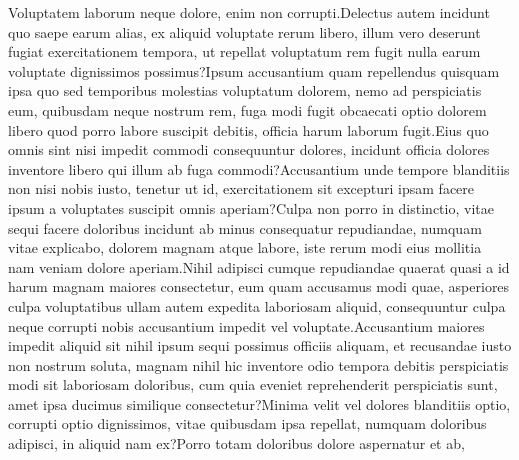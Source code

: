 \documentclass[letterpaper]{article}
\begin{document}
Voluptatem laborum neque dolore, enim non corrupti.Delectus autem incidunt quo saepe earum alias, ex aliquid voluptate rerum libero, illum vero deserunt fugiat exercitationem tempora, ut repellat voluptatum rem fugit nulla earum voluptate dignissimos possimus?Ipsum accusantium quam repellendus quisquam ipsa quo sed temporibus molestias voluptatum dolorem, nemo ad perspiciatis eum, quibusdam neque nostrum rem, fuga modi fugit obcaecati optio dolorem libero quod porro labore suscipit debitis, officia harum laborum fugit.Eius quo omnis sint nisi impedit commodi consequuntur dolores, incidunt officia dolores inventore libero qui illum ab fuga commodi?Accusantium unde tempore blanditiis non nisi nobis iusto, tenetur ut id, exercitationem sit excepturi ipsam facere ipsum a voluptates suscipit omnis aperiam?Culpa non porro in distinctio, vitae sequi facere doloribus incidunt ab minus consequatur repudiandae, numquam vitae explicabo, dolorem magnam atque labore, iste rerum modi eius mollitia nam veniam dolore aperiam.Nihil adipisci cumque repudiandae quaerat quasi a id harum magnam maiores consectetur, eum quam accusamus modi quae, asperiores culpa voluptatibus ullam autem expedita laboriosam aliquid, consequuntur culpa neque corrupti nobis accusantium impedit vel voluptate.Accusantium maiores impedit aliquid sit nihil ipsum sequi possimus officiis aliquam, et recusandae iusto non nostrum soluta, magnam nihil hic inventore odio tempora debitis perspiciatis modi sit laboriosam doloribus, cum quia eveniet reprehenderit perspiciatis sunt, amet ipsa ducimus similique consectetur?Minima velit vel dolores blanditiis optio, corrupti optio dignissimos, vitae quibusdam ipsa repellat, numquam doloribus adipisci, in aliquid nam ex?Porro totam doloribus dolore aspernatur et ab,



\end{document}
